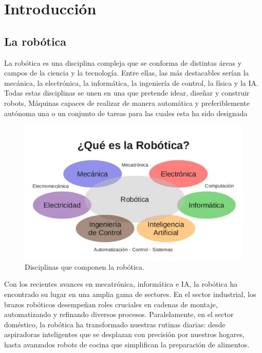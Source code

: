\chapter{Introducción}
\label{cap:capitulo1}
\setcounter{page}{1}

\section{La robótica }
\label{sec:La_robótica}

La robótica es una disciplina compleja que se conforma de distintas áreas y campos de la ciencia y la tecnología. Entre ellas, las más destacables serían la mecánica, la electrónica,  la informática, la ingeniería de control, la física y la \ac{IA}. Todas estas disciplinas se unen en una que pretende idear, diseñar y construir robots, Máquinas capaces de realizar de manera automática y preferiblemente autónoma una o un conjunto de tareas para las cuales esta ha sido designada \cite{wikipedia-de-robot}\\

\bigskip

\begin{figure}[h] 
    \centering
    \includegraphics[width=0.7\linewidth]{imagenes/cap1/disciplinas_robotica.jpg} 
    \caption{Disciplinas que componen la robótica.}
    \label{fig:Disciplinas que componen la robótica.} 
\end{figure}

\bigskip

Con los recientes avances en mecatrónica, informática e \ac{IA}, la robótica ha encontrado su lugar en una amplia gama de sectores. En el sector industrial, los brazos robóticos desempeñan roles cruciales en cadenas de montaje, automatizando y refinando diversos procesos. Paralelamente, en el sector doméstico, la robótica ha transformado nuestras rutinas diarias: desde aspiradoras inteligentes que se desplazan con precisión por nuestros hogares, hasta avanzados robots de cocina que simplifican la preparación de alimentos.
\bigskip


